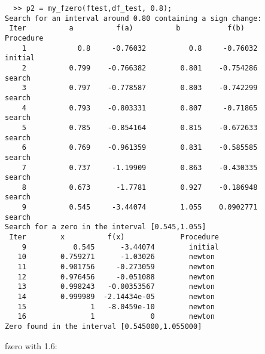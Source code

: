 \documentclass{article}
\begin{document}
\begin{verbatim}
  >> p2 = my_fzero(ftest,df_test, 0.8);
Search for an interval around 0.80 containing a sign change:
 Iter          a          f(a)          b           f(b)         Procedure
    1            0.8     -0.76032          0.8     -0.76032        initial
    2          0.799    -0.766382        0.801    -0.754286        search
    3          0.797    -0.778587        0.803    -0.742299        search
    4          0.793    -0.803331        0.807     -0.71865        search
    5          0.785    -0.854164        0.815    -0.672633        search
    6          0.769    -0.961359        0.831    -0.585585        search
    7          0.737     -1.19909        0.863    -0.430335        search
    8          0.673      -1.7781        0.927    -0.186948        search
    9          0.545     -3.44074        1.055    0.0902771        search
Search for a zero in the interval [0.545,1.055]
 Iter        x          f(x)             Procedure
    9           0.545      -3.44074        initial
   10        0.759271      -1.03026        newton
   11        0.901756     -0.273059        newton
   12        0.976456     -0.051088        newton
   13        0.998243   -0.00353567        newton
   14        0.999989  -2.14434e-05        newton
   15               1   -8.0459e-10        newton
   16               1             0        newton
Zero found in the interval [0.545000,1.055000]
\end{verbatim}
fzero with 1.6:
\end{document}
